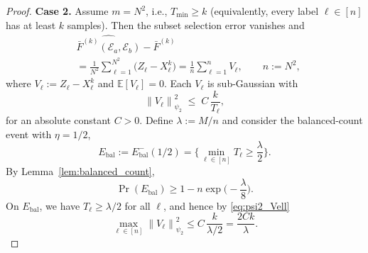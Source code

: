\documentclass[aps,prx,reprint,superscriptaddress,amsmath,amssymb,longbibliography,floatfix]{revtex4-2}
\newcommand{\norm}[1]{\left \lVert #1 \right \rVert}
\newcommand{\abs}[1]{\lvert #1\rvert}
\newcommand{\dsE}{\mathbb{E}}
\newcommand{\scE}{\mathcal{E}}
\theoremstyle{plain}
\theoremstyle{definition}
\theoremstyle{remark}
\begin{document}
\begin{proof}
    \textbf{Case 2.}
    Assume $m=N^2$, i.e., $T_{\min}\ge k$ (equivalently, every label $\ell\in[n]$ has at least $k$ samples).
    Then the subset selection error vanishes and
    \[
\begin{aligned}
&\widehat{\bar{F}^{(k)}(\scE_a,\scE_b)}-\bar{F}^{(k)}\\
    &=
    \frac{1}{N^2}\sum_{\ell=1}^{N^2}\big(Z_\ell-X_\ell^k\big)
    =
    \frac{1}{n}\sum_{\ell=1}^{n}V_\ell,
    \qquad n:=N^2,
\end{aligned}
\]
    where $V_\ell:=Z_\ell-X_\ell^k$ and $\dsE[V_\ell]=0$.
    Each $V_\ell$ is sub-Gaussian \cite{Vershynin_high_dimensional_probability} with
    \begin{equation}\label{eq:psi2_Vell}
    \norm{V_\ell}_{\psi_2}^2 \;\le\; C\,\frac{k}{T_\ell},
    \end{equation}
    for an absolute constant $C>0$. %
    Define $\lambda:=M/n$ and consider the balanced-count event with $\eta=1/2$,
    \[
    E_{\mathrm{bal}} := E_{\mathrm{bal}}^{-}(1/2)
    =\Big\{\min_{\ell\in[n]}T_\ell \ge \frac{\lambda}{2}\Big\}.
    \]
    By Lemma~\ref{lem:balanced_count},
    \begin{equation}\label{eq:Ebal_prob_case2}
    \Pr(E_{\mathrm{bal}})
    \ge
    1-n\exp\!\Big(-\frac{\lambda}{8}\Big).
    \end{equation}
    On $E_{\mathrm{bal}}$, we have $T_\ell\ge \lambda/2$ for all $\ell$, and hence by \eqref{eq:psi2_Vell}
    \begin{equation}\label{eq:psi2_uniform_on_Ebal}
    \max_{\ell\in[n]}\norm{V_\ell}_{\psi_2}^2
    \le
    C\,\frac{k}{\lambda/2}
    =
    \frac{2Ck}{\lambda}.
    \end{equation}
    

\end{proof}
\end{document}
